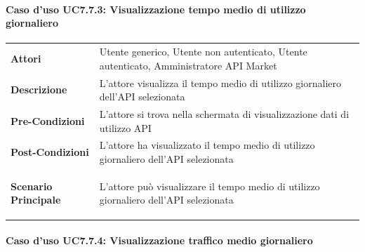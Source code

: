 \paragraph{Caso d'uso UC7.7.3: Visualizzazione tempo medio di utilizzo giornaliero}
\label{UC7_7_3}

\begin{minipage}{\linewidth}
	\begin{tabular}{ l | p{11cm}}
		\hline
		\rowcolor{Gray}
		\multicolumn{2}{c}{UC7.7.3 - Visualizzazione tempo medio di utilizzo giornaliero} \\
		\hline
		\textbf{Attori} & Utente generico, Utente non autenticato, Utente autenticato, Amministratore API Market \\
		\textbf{Descrizione} & L'attore visualizza il tempo medio di utilizzo giornaliero dell'API selezionata \\
		\textbf{Pre-Condizioni} & L'attore si trova nella schermata di visualizzazione dati di utilizzo API \\
		\textbf{Post-Condizioni} & L'attore ha visualizzato il tempo medio di utilizzo giornaliero dell'API selezionata \\
		\textbf{Scenario Principale} & 
		\begin{enumerate*}[label=(\arabic*.),itemjoin={\newline}]
			\item L'attore può visualizzare il tempo medio di utilizzo giornaliero dell'API selezionata
		\end{enumerate*}\\
	\end{tabular}
\end{minipage}

\paragraph{Caso d'uso UC7.7.4: Visualizzazione traffico medio giornaliero}
\label{UC7_7_4}

